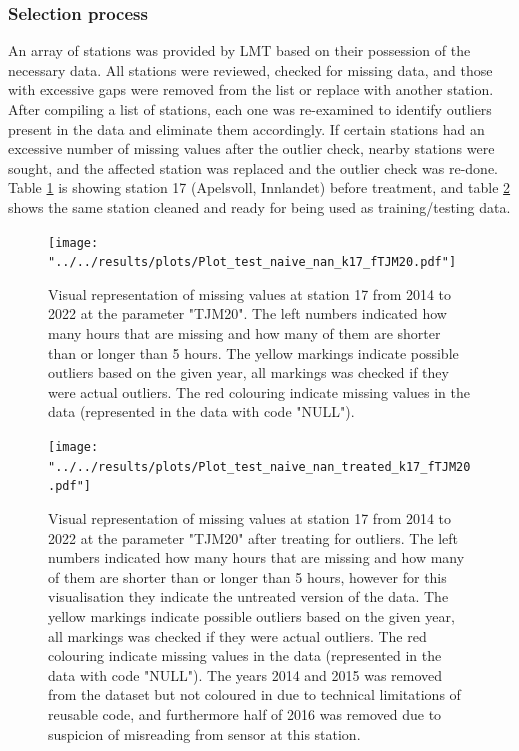 \subsubsection{Selection process}

An array of stations was provided by LMT based on their possession of the necessary data. All stations were reviewed, checked for missing data, and those with excessive gaps were removed from the list or replace with another station. After compiling a list of stations, each one was re-examined to identify outliers present in the data and eliminate them accordingly. If certain stations had an excessive number of missing values after the outlier check, nearby stations were sought, and the affected station was replaced and the outlier check was re-done. Table \ref{fig:plot-17} is showing station 17 (Apelsvoll, Innlandet) before treatment, and table \ref{fig:plot-17-treated} shows the same station cleaned and ready for being used as training/testing data.

\begin{figure}
		\centering
		\begin{adjustwidth}{-1in}{-1in}
			\texttt{[image: "../../results/plots/Plot\_test\_naive\_nan\_k17\_fTJM20.pdf"]}
		\end{adjustwidth}
		\caption[Visual representation of station 17]{Visual representation of missing values at station 17 from 2014 to 2022 at the parameter "TJM20". The left numbers indicated how many hours that are missing and how many of them are shorter than or longer than 5 hours. The yellow markings indicate possible outliers based on the given year, all markings was checked if they were actual outliers. The red colouring indicate missing values in the data (represented in the data with code "NULL").}
		\label{fig:plot-17}
\end{figure}
\begin{figure}
		\centering
		\begin{adjustwidth}{-1in}{-1in}
			\texttt{[image: "../../results/plots/Plot\_test\_naive\_nan\_treated\_k17\_fTJM20.pdf"]}
		\end{adjustwidth}
		\caption[Visual representation of station 17 treated]{Visual representation of missing values at station 17 from 2014 to 2022 at the parameter "TJM20" after treating for outliers. The left numbers indicated how many hours that are missing and how many of them are shorter than or longer than 5 hours, however for this visualisation they indicate the untreated version of the data. The yellow markings indicate possible outliers based on the given year, all markings was checked if they were actual outliers. The red colouring indicate missing values in the data (represented in the data with code "NULL"). The years 2014 and 2015 was removed from the dataset but not coloured in due to technical limitations of reusable code, and furthermore half of 2016 was removed due to suspicion of misreading from sensor at this station.}
		\label{fig:plot-17-treated}
\end{figure}

